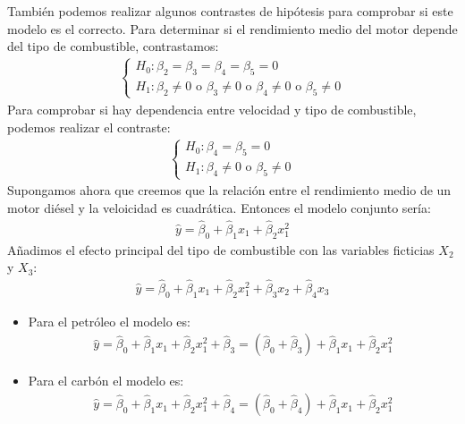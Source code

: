 \begin{ejemplo}
    También podemos realizar algunos contrastes de hipótesis para comprobar si este modelo es el correcto. Para determinar si el rendimiento medio del motor depende del tipo de combustible, contrastamos:
    \begin{align*}
        \begin{cases}
            H_0: \beta_2 = \beta_3 = \beta_4 = \beta_5 = 0 \\
            H_1: \beta_2 \neq 0 \text{ o } \beta_3 \neq 0 \text{ o } \beta_4 \neq 0 \text{ o } \beta_5 \neq 0
        \end{cases}
    \end{align*}
    Para comprobar si hay dependencia entre velocidad y tipo de combustible, podemos realizar el contraste:
    \begin{align*}
        \begin{cases}
            H_0: \beta_4 = \beta_5 = 0 \\
            H_1: \beta_4 \neq 0 \text{ o } \beta_5 \neq 0
        \end{cases}
    \end{align*}
    Supongamos ahora que creemos que la relación entre el rendimiento medio de un motor diésel y la veloicidad es cuadrática. Entonces el modelo conjunto sería:
    \begin{align*}
        \widehat{y} = \widehat{\beta}_0 + \widehat{\beta}_1x_1 + \widehat{\beta}_2x_1^2
    \end{align*}
    Añadimos el efecto principal del tipo de combustible con las variables ficticias $X_2$ y $X_3$:
    \begin{align*}
        \widehat{y} = \widehat{\beta}_0 + \widehat{\beta}_1x_1 + \widehat{\beta}_2x_1^2 + \widehat{\beta}_3x_2 + \widehat{\beta}_4x_3
    \end{align*}
    \begin{itemize}
        \item Para el petróleo el modelo es:
              \begin{align*}
                  \widehat{y} = \widehat{\beta}_0 + \widehat{\beta}_1x_1 + \widehat{\beta}_2x_1^2 + \widehat{\beta}_3 = (\widehat{\beta}_0 + \widehat{\beta}_3) + \widehat{\beta}_1x_1 + \widehat{\beta}_2x_1^2
              \end{align*}
        \item Para el carbón el modelo es:
              \begin{align*}
                  \widehat{y} = \widehat{\beta}_0 + \widehat{\beta}_1x_1 + \widehat{\beta}_2x_1^2 + \widehat{\beta}_4 = (\widehat{\beta}_0 + \widehat{\beta}_4) + \widehat{\beta}_1x_1 + \widehat{\beta}_2x_1^2

\end{align*}
\end{itemize}
\end{ejemplo}

